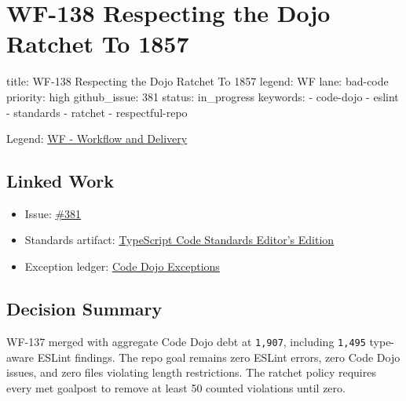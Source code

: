 \chapter{WF-138 Respecting the Dojo Ratchet To 1857}\label{record-220}

\smallskip

\begin{RecordMeta}
title: WF-138 Respecting the Dojo Ratchet To 1857
legend: WF
lane: bad-code
priority: high
github_issue: 381
status: in_progress
keywords:
  - code-dojo
  - eslint
  - standards
  - ratchet
  - respectful-repo

\end{RecordMeta}

Legend: \href{https://github.com/flyingrobots/bijou/blob/cbd70612140e7a450d764b3c7be1c6af878b99bc/docs/legends/WF-workflow-delivery.md}{WF - Workflow and Delivery}

\section{Linked Work}\label{record-220-linked-work}

\begin{itemize}
\tightlist
\item
  Issue: \href{https://github.com/flyingrobots/bijou/issues/381}{\#381}
\item
  Standards artifact: \href{https://github.com/flyingrobots/bijou/blob/cbd70612140e7a450d764b3c7be1c6af878b99bc/docs/typescript-code-standards.editors-edition.md}{TypeScript Code Standards Editor's Edition}
\item
  Exception ledger: \href{https://github.com/flyingrobots/bijou/blob/cbd70612140e7a450d764b3c7be1c6af878b99bc/docs/code-dojo-exceptions.md}{Code Dojo Exceptions}
\end{itemize}

\section{Decision Summary}\label{record-220-decision-summary}

WF-137 merged with aggregate Code Dojo debt at \texttt{1\allowbreak{},\allowbreak{}9\allowbreak{}0\allowbreak{}7}, including \texttt{1\allowbreak{},\allowbreak{}4\allowbreak{}9\allowbreak{}5} type-aware ESLint findings. The repo goal remains zero ESLint errors, zero Code Dojo issues, and zero files violating length restrictions. The ratchet policy requires every met goalpost to remove at least 50 counted violations until zero.

